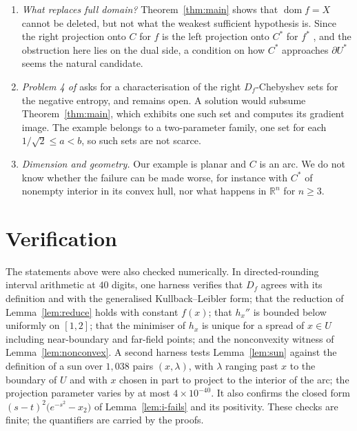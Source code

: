 \documentclass[11pt]{amsart}
\theoremstyle{plain}
\theoremstyle{definition}
\theoremstyle{remark}
\newcommand{\R}{\mathbb{R}}
\newcommand{\dom}{\operatorname{dom}}
\newcommand{\D}{D_f}
\newcommand{\Cstar}{C^{*}}
\begin{document}
\begin{enumerate}[leftmargin=2.2em]
\item \emph{What replaces full domain?} Theorem~\ref{thm:main} shows that
$\dom f = X$ cannot be deleted, but not what the weakest sufficient hypothesis
is. Since the right projection onto $C$ for $f$ is the left projection onto
$\Cstar$ for $f^{*}$ \cite[Lemma 3.2]{LMWY2019}, and the obstruction here lies
on the dual side, a condition on how $\Cstar$ approaches $\partial U^{*}$ seems
the natural candidate.

\item \emph{Problem 4 of \cite{BMW2010}} asks for a characterisation of the
right $\D$-Chebyshev sets for the negative entropy, and remains open. A solution
would subsume Theorem~\ref{thm:main}, which exhibits one such set and computes
its gradient image. The example belongs to a two-parameter family, one set for
each $1/\sqrt2 \le a < b$, so such sets are not scarce.

\item \emph{Dimension and geometry.} Our example is planar and $C$ is an arc. We
do not know whether the failure can be made worse, for instance with $\Cstar$ of
nonempty interior in its convex hull, nor what happens in $\R^{n}$ for
$n \ge 3$.
\end{enumerate}

\section*{Verification}

The statements above were also checked numerically. In directed-rounding
interval arithmetic at $40$ digits, one harness verifies that $\D$ agrees with
its definition and with the generalised Kullback--Leibler form; that the
reduction of Lemma~\ref{lem:reduce} holds with constant $f(x)$; that $h_{x}''$
is bounded below uniformly on $[1,2]$; that the minimiser of $h_{x}$ is unique
for a spread of $x \in U$ including near-boundary and far-field points; and the
nonconvexity witness of Lemma~\ref{lem:nonconvex}. A second harness tests
Lemma~\ref{lem:sun} against the definition of a sun over $1{,}038$ pairs
$(x,\lambda)$, with $\lambda$ ranging past $x$ to the boundary of $U$ and with
$x$ chosen in part to project to the interior of the arc; the projection
parameter varies by at most $4 \times 10^{-40}$. It also confirms the closed
form $(s-t)^{2}\bigl(e^{-s^{2}} - x_{2}\bigr)$ of
Lemma~\ref{lem:i-fails} and its positivity. These checks are finite; the
quantifiers are carried by the proofs.
\end{document}

